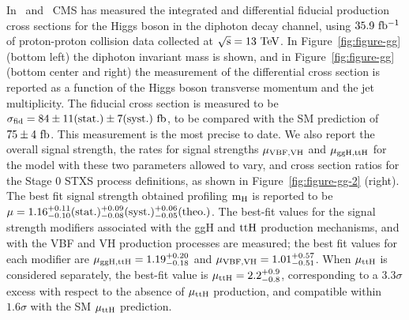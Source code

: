 \documentclass[10pt]{article}
\begin{document}
In~\cite{CMS:HIG-17-015} and~\cite{CMS:HIG-16-040} CMS has measured the
integrated and differential fiducial production cross sections for the Higgs
boson in the diphoton decay channel, using ${\rm 35.9~fb^{-1}}$ of proton-proton
collision data collected at ${\rm \sqrt{s} = 13~TeV}$. In
Figure~\ref{fig:figure-gg} (bottom left) the diphoton invariant mass is shown,
and in Figure~\ref{fig:figure-gg} (bottom center and right) the measurement of
the differential cross section is reported as a function of the Higgs boson
transverse momentum and the jet multiplicity. The fiducial cross
section is measured to be ${\rm \sigma_{fid} = 84\pm 11(stat.)\pm 7(syst.)~fb}$, to
be compared with the SM prediction of ${\rm 75 \pm 4~fb}$. This measurement is the
most precise to date. We also report the overall signal strength, the rates for
signal strengths ${\rm \mu_{VBF,VH}}$ and ${\rm \mu_{ggH,ttH}}$ for the model with
these two parameters allowed to vary, and cross section ratios for the Stage 0 STXS
process definitions, as shown in Figure~\ref{fig:figure-gg-2} (right). The best fit
signal strength obtained profiling ${\rm m_H}$ is reported to be
${\rm \mu = 1.16_{-0.10}^{+0.11}(stat.)_{-0.08}^{+0.09}(syst.)_{-0.05}^{+0.06}(theo.)}$.
The best-fit values for the signal strength modifiers associated with the ggH and
${\rm ttH}$ production mechanisms, and with the VBF and VH production processes
are measured; the best fit values for each modifier are
${\rm \mu_{ggH,ttH} = 1.19_{-0.18}^{+0.20}}$ and
${\rm \mu_{VBF,VH} = 1.01_{-0.51}^{+0.57}}$. When ${\rm \mu_{ttH}}$ is considered
separately, the best-fit value is ${\rm \mu_{ttH} = 2.2_{-0.8}^{+0.9}}$, corresponding
to a $3.3\sigma$ excess with respect to the absence of ${\rm \mu_{ttH}}$ production,
and compatible within $1.6\sigma$ with the SM ${\rm \mu_{ttH}}$ prediction.
\end{document}
